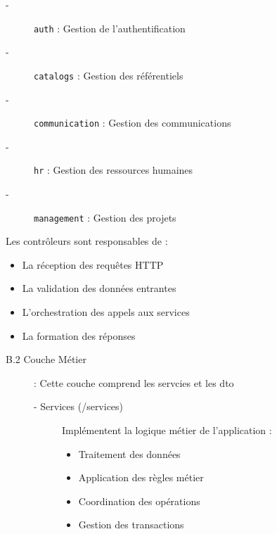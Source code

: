 {\begin{enumerate}
\begin{description}
\begin{description}
                \begin{description}
                    \item[-] \verb|auth| :  Gestion de l'authentification
                    \item[-] \verb|catalogs| : Gestion des référentiels
                    \item[-] \verb|communication| : Gestion des communications
                    \item[-] \verb|hr| : Gestion des ressources humaines
                    \item[-] \verb|management| : Gestion des projets
                \end{description}
            \end{description}

            Les contrôleurs sont responsables de :

            \begin{itemize}
                \item La réception des requêtes HTTP
                \item La validation des données entrantes
                \item L'orchestration des appels aux services
                \item La formation des réponses
            \end{itemize}

            \vspace{0.35cm}

            \begin{description}
                \item[B.2 Couche Métier] : 
                    Cette couche comprend les servcies et les dto 
                    \begin{description}
                        \item[- Services (/services)] 
                            Implémentent la logique métier de l'application :
                            
                            \begin{itemize}
                                \item Traitement des données
                                \item Application des règles métier
                                \item Coordination des opérations
                                \item Gestion des transactions
                            \end{itemize}


\end{description}
\end{description}
\end{description}
\end{enumerate}}
